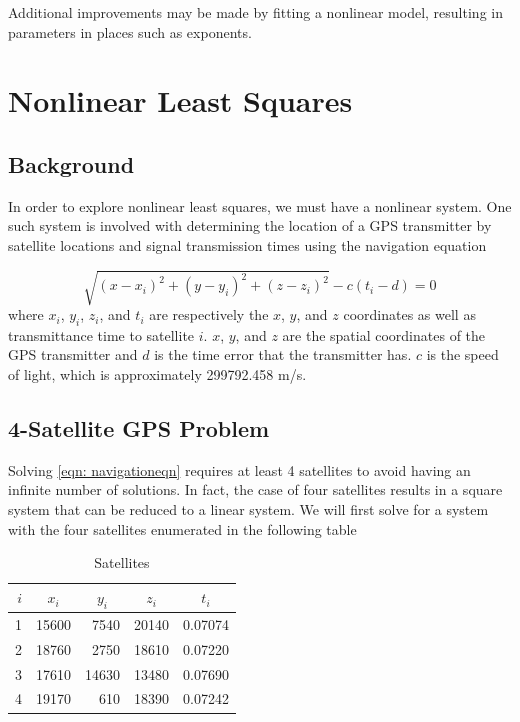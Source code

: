 \documentclass[10pt,a4paper]{article}
\begin{document}
Additional improvements may be made by fitting a nonlinear model, resulting in parameters in places such as exponents.


\section*{Nonlinear Least Squares}

\subsection*{Background}

In order to explore nonlinear least squares, we must have a nonlinear system. One such system is involved with determining the location of a GPS transmitter by satellite locations and signal transmission times using the navigation equation

\begin{equation}
\sqrt{ \left( x - x_i \right)^2 + \left( y - y_i \right)^2 + \left( z - z_i \right)^2 } - c \left( t_i - d \right) = 0
\label{eqn: navigationeqn}
\end{equation}
where $x_i$, $y_i$, $z_i$, and $t_i$ are respectively the $x$, $y$, and $z$ coordinates as well as transmittance time to satellite $i$. $x$, $y$, and $z$ are the spatial coordinates of the GPS transmitter and $d$ is the time error that the transmitter has. $c$ is the speed of light, which is approximately 299792.458 m/s.

\subsection*{4-Satellite GPS Problem}

Solving \cref{eqn: navigationeqn} requires at least 4 satellites to avoid having an infinite number of solutions. In fact, the case of four satellites results in a square system that can be reduced to a linear system. We will first solve for a system with the four satellites enumerated in the following table

\begin{table}[H]
\centering
\begin{tabular}{r|rrrr}
$i$ & \multicolumn{1}{c}{$x_i$} & \multicolumn{1}{c}{$y_i$} & \multicolumn{1}{c}{$z_i$} & \multicolumn{1}{c}{$t_i$} \\ \hline
1 & 15600                    & 7540                     & 20140                    & 0.07074                  \\
2 & 18760                    & 2750                     & 18610                    & 0.07220                  \\
3 & 17610                    & 14630                    & 13480                    & 0.07690                  \\
4 & 19170                    & 610                      & 18390                    & 0.07242                 
\end{tabular}
\caption{Satellites}
\label{table: satellites}
\end{table}
\end{document}
